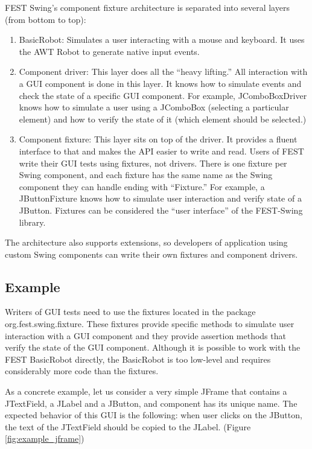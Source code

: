 FEST Swing's component fixture architecture is separated into several layers (from bottom to top):
\begin{enumerate}
\item BasicRobot: Simulates a user interacting with a mouse and keyboard. It uses the AWT Robot to generate native input events.
\item Component driver: This layer does all the ``heavy lifting.'' All interaction with a GUI component is done in this layer. It knows how to simulate events and check the state of a specific GUI component. For example, JComboBoxDriver knows how to simulate a user using a JComboBox (selecting a particular element) and how to verify the state of it (which element should be selected.)
\item Component fixture: This layer sits on top of the driver. It provides a fluent interface to that and makes the API easier to write and read. Users of FEST write their GUI tests using fixtures, not drivers. There is one fixture per Swing component, and each fixture has the same name as the Swing component they can handle ending with ``Fixture.'' For example, a JButtonFixture knows how to simulate user interaction and verify state of a JButton. Fixtures can be considered the ``user interface'' of the FEST-Swing library.
\end{enumerate}

The architecture also supports extensions, so developers of application using custom Swing components can write their own fixtures and component drivers.

\subsection{Example}

Writers of GUI tests need to use the fixtures located in the package org.fest.swing.fixture. These fixtures provide specific methods to simulate user interaction with a GUI component and they provide assertion methods that verify the state of the GUI component. Although it is possible to work with the FEST BasicRobot directly, the BasicRobot is too low-level and requires considerably more code than the fixtures.

As a concrete example, let us consider a very simple JFrame that contains a JTextField, a JLabel and a JButton, and component has its unique name. The expected behavior of this GUI is the following: when user clicks on the JButton, the text of the JTextField should be copied to the JLabel. (Figure \ref{fig:example_jframe}) 

